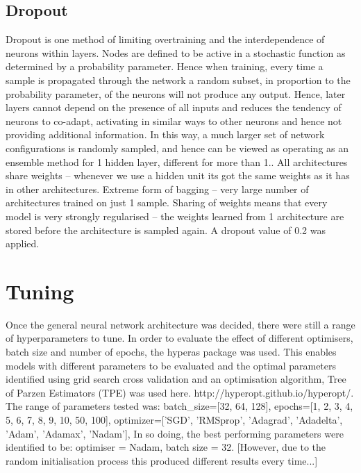 \subsection{Dropout}
Dropout is one method of limiting overtraining and the interdependence of neurons within layers. Nodes are defined to be active in a stochastic function as determined by a probability parameter. Hence when training, every time a sample is propagated through the network a random subset, in proportion to the probability parameter, of the neurons will not produce any output. Hence, later layers cannot depend on the presence of all inputs and reduces the tendency of neurons to co-adapt, activating in similar ways to other neurons and hence not providing additional information. In this way, a much larger set of network configurations is randomly sampled, and hence can be viewed as operating as an ensemble method for 1 hidden layer, different for more than 1.. All architectures share weights – whenever we use a hidden unit its got the same weights as it has in other architectures. Extreme form of bagging – very large number of architectures trained on just 1 sample. Sharing of weights means that every model is very strongly regularised – the weights learned from 1 architecture are stored before the architecture is sampled again. A dropout value of 0.2 was applied.

\section{Tuning}
Once the general neural network architecture was decided, there were still a range of hyperparameters to tune. In order to evaluate the effect of different optimisers, batch size and number of epochs, the hyperas package was used. This enables models with different parameters to be evaluated and the optimal parameters identified using grid search cross validation and an optimisation algorithm, Tree of Parzen Estimators (TPE) was used here. http://hyperopt.github.io/hyperopt/.
The range of parameters tested was: 
batch\_size=[32, 64, 128],
epochs=[1, 2, 3, 4, 5, 6, 7, 8, 9, 10, 50, 100],
optimizer=['SGD', 'RMSprop', 'Adagrad', 'Adadelta', 'Adam', 'Adamax', 'Nadam'],
In so doing, the best performing parameters were identified to be:
optimiser = Nadam, batch size = 32. [However, due to the random initialisation process this produced different results every time...]
